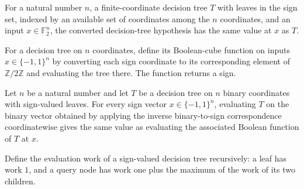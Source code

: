 \begin{theorem}
\leanok
{}
For a natural number $n$, a finite-coordinate decision tree $T$ with leaves in the sign
set, indexed by an available set of coordinates among the $n$ coordinates, and an input
$x\in\mathbb F_2^n$, the converted decision-tree hypothesis has the same value at $x$ as
$T$.
\end{theorem}

\begin{definition}
\label{FABL.DecisionTreeHypothesis.evaluate}
\leanok
{}
For a decision tree on $n$ coordinates, define its Boolean-cube function on inputs
$x\in\{ -1,1\}^n$ by converting each sign coordinate to its corresponding element of
$\mathbb Z/2\mathbb Z$ and evaluating the tree there. The function returns a sign.
\end{definition}

\begin{theorem}
\leanok
{}
Let $n$ be a natural number and let $T$ be a decision tree on $n$ binary coordinates
with sign-valued leaves. For every sign vector $x\in\{-1,1\}^n$, evaluating $T$ on the
binary vector obtained by applying the inverse binary-to-sign correspondence
coordinatewise gives the same value as evaluating the associated Boolean function of $T$
at $x$.
\end{theorem}

\begin{definition}
\label{FABL.DecisionTreeHypothesis.evaluationWork}
\leanok
{}
Define the evaluation work of a sign-valued decision tree recursively: a leaf has work
$1$, and a query node has work one plus the maximum of the work of its two children.
\end{definition}

